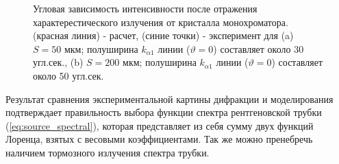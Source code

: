 \begin{figure}[H]
  \centering
  \hfill
  \caption{Угловая зависимость интенсивности после отражения характерестического излучения от кристалла монохроматора.
   (красная линия) - расчет, (синие точки) - эксперимент для (a) $S = 50$ мкм; полуширина $k_{\alpha 1}$ линии ($\vartheta=0$)
   составляет около 30 угл.сек., (b) $S = 200$ мкм; полуширина $k_{\alpha 1}$ линии ($\vartheta=0$)
   составляет около 50 угл.сек.}
  \label{ris:zero_exp}
\end{figure}

Результат сравнения экспериментальной картины дифракции и моделирования
подтверждает правильность выбора функции спектра рентгеновской трубки (\ref{eq:source_spectral}),
которая представляет из себя сумму двух функций Лоренца, взятых с весовыми коэффициентами.
Так же можно пренебречь наличием тормозного излучения спектра трубки.
